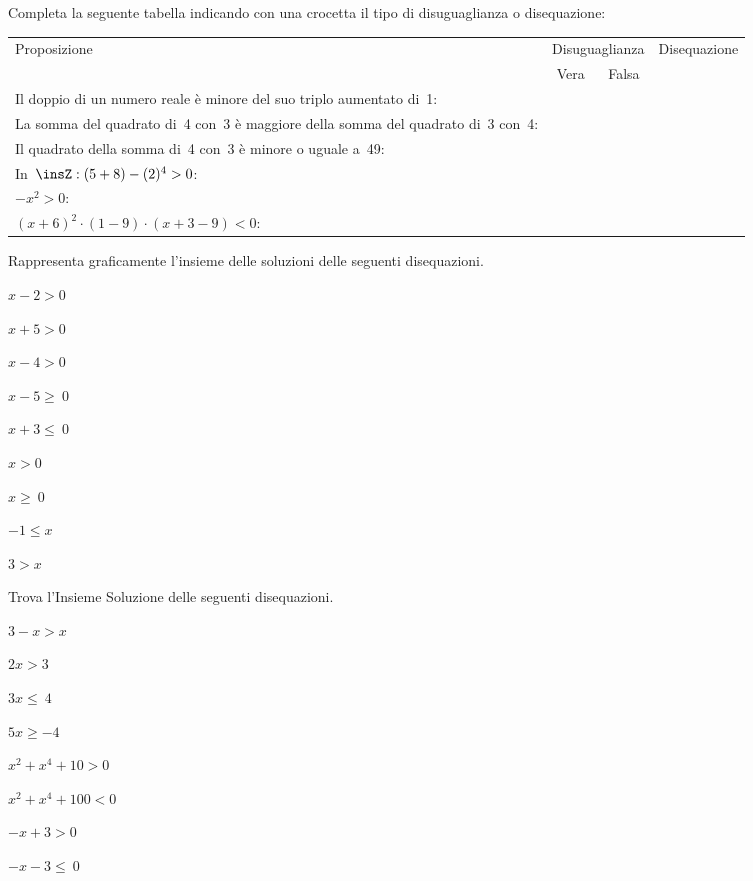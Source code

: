 \begin{esercizio}
 \label{ese:21.8}
Completa la seguente tabella indicando con una crocetta il tipo di
disuguaglianza o disequazione:

 \begin{tabularx}{.9\textwidth}{X|c|c|c|}
 \toprule
 Proposizione&\multicolumn{2}{c}{Disuguaglianza}& Disequazione\\
  & Vera & Falsa & \\
 \midrule
 Il doppio di un numero reale è minore del suo triplo aumentato di~1: & & & \\
 \midrule
 La somma del quadrato di~4 con~3 è maggiore della somma del quadrato di~3 con~4: & & &\\
 \midrule
 Il quadrato della somma di~4 con~3 è minore o uguale a~49: & & & \\
 \midrule
 In~\(\insZ:(5+8)-(2)^{4}>0\): & & & \\
 \midrule
 \(-x^{2}>0\): & & & \\
 \midrule
 \((x+6)^{2}\cdot (1-9)\cdot (x+3-9)<0\): & & & \\
 \bottomrule
 \end{tabularx}
\end{esercizio}

\begin{esercizio}
 \label{ese:21.9}
 Rappresenta graficamente l'insieme delle soluzioni
delle seguenti disequazioni.
\begin{multicols}{3}
 \begin{enumeratea}
 \item \(x-2>0\)
\item \(x+5>0\)
\item \(x-4>0\)
\item \(x-5\ge~0\)
\item \(x+3\le~0\)
\item \(x>0\)
\item \(x\ge~0\)
\item \(-1\le x\)
\item \(3>x\)
 \end{enumeratea}
\end{multicols}
\end{esercizio}

\begin{esercizio}[\Ast]
 \label{ese:21.10}
Trova l'Insieme Soluzione delle seguenti disequazioni.
\begin{multicols}{2}
 \begin{enumeratea}
 \item \(3-x>x\)
\item \(2x>3\)
\item \(3x\le~4\)
\item \(5x\ge -4\)
\item \(x^{2}+x^{4}+10>0\)
\item \(x^{2}+x^{4}+100<0\)
\item \(-x+3>0\)
\item \(-x-3\le~0\)
\end{enumeratea}
\end{multicols}
\end{esercizio}

